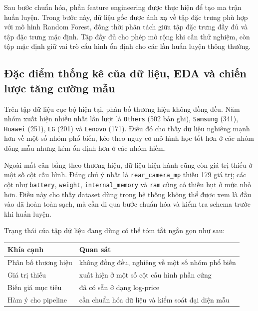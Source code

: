 Sau bước chuẩn hóa, phần feature engineering được thực hiện để tạo ma trận huấn luyện. Trong bước này, dữ liệu gốc được ánh xạ về tập đặc trưng phù hợp với mô hình Random Forest, đồng thời phân tách giữa tập đặc trưng đầy đủ và tập đặc trưng mặc định. Tập đầy đủ cho phép mở rộng khi cần thử nghiệm, còn tập mặc định giữ vai trò cấu hình ổn định cho các lần huấn luyện thông thường.

\subsection{Đặc điểm thống kê của dữ liệu, EDA và chiến lược tăng cường mẫu}

Trên tập dữ liệu cục bộ hiện tại, phân bố thương hiệu không đồng đều. Năm nhóm xuất hiện nhiều nhất lần lượt là \texttt{Others} (502 bản ghi), \texttt{Samsung} (341), \texttt{Huawei} (251), \texttt{LG} (201) và \texttt{Lenovo} (171). Điều đó cho thấy dữ liệu nghiêng mạnh hơn về một số nhóm phổ biến, kéo theo nguy cơ mô hình học tốt hơn ở các nhóm đông mẫu nhưng kém ổn định hơn ở các nhóm hiếm.

Ngoài mất cân bằng theo thương hiệu, dữ liệu hiện hành cũng còn giá trị thiếu ở một số cột cấu hình. Đáng chú ý nhất là \texttt{rear\_camera\_mp} thiếu 179 giá trị; các cột như \texttt{battery}, \texttt{weight}, \texttt{internal\_memory} và \texttt{ram} cũng có thiếu hụt ở mức nhỏ hơn. Điều này cho thấy dataset dùng trong hệ thống không thể được xem là đầu vào đã hoàn toàn sạch, mà cần đi qua bước chuẩn hóa và kiểm tra schema trước khi huấn luyện.

Trạng thái của tập dữ liệu đang dùng có thể tóm tắt ngắn gọn như sau:

\begin{center}
\begin{tabular}{|l|l|}
\hline
\textbf{Khía cạnh} & \textbf{Quan sát} \\
\hline
Phân bố thương hiệu & không đồng đều, nghiêng về một số nhóm phổ biến \\
\hline
Giá trị thiếu & xuất hiện ở một số cột cấu hình phần cứng \\
\hline
Biến giá mục tiêu & đã có sẵn ở dạng log-price \\
\hline
Hàm ý cho pipeline & cần chuẩn hóa dữ liệu và kiểm soát đại diện mẫu \\
\hline
\end{tabular}
\end{center}

